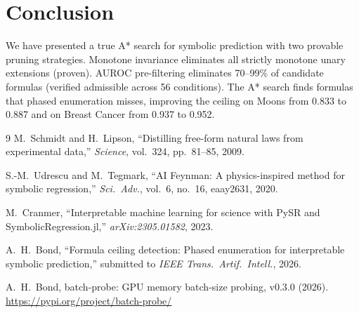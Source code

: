 \documentclass[journal]{IEEEtran}
\begin{document}
\section{Conclusion}

We have presented a true A* search for symbolic prediction with
two provable pruning strategies. Monotone invariance eliminates
all strictly monotone unary extensions (proven). AUROC pre-filtering
eliminates 70--99\% of candidate formulas (verified admissible
across 56 conditions). The A* search finds formulas that phased
enumeration misses, improving the ceiling on Moons from 0.833 to
0.887 and on Breast Cancer from 0.937 to 0.952.

\begin{thebibliography}{9}
M.~Schmidt and H.~Lipson, ``Distilling free-form natural laws from
experimental data,'' \emph{Science}, vol.~324, pp.~81--85, 2009.

S.-M.~Udrescu and M.~Tegmark, ``AI Feynman: A physics-inspired
method for symbolic regression,'' \emph{Sci.\ Adv.}, vol.~6,
no.~16, eaay2631, 2020.

M.~Cranmer, ``Interpretable machine learning for science with PySR
and SymbolicRegression.jl,'' \emph{arXiv:2305.01582}, 2023.

A.~H.~Bond, ``Formula ceiling detection: Phased enumeration for
interpretable symbolic prediction,'' submitted to \emph{IEEE Trans.\
Artif.\ Intell.}, 2026.

A.~H.~Bond, batch-probe: GPU memory batch-size probing, v0.3.0
(2026). \url{https://pypi.org/project/batch-probe/}
\end{thebibliography}
\end{document}

